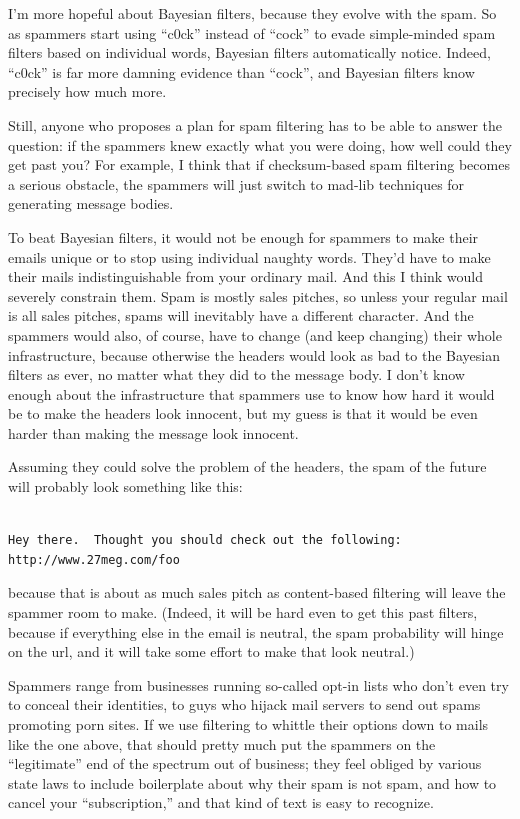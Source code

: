 I'm more hopeful about Bayesian filters, because they evolve with the
spam. So as spammers start using ``c0ck'' instead of ``cock'' to evade
simple-minded spam filters based on individual words, Bayesian filters
automatically notice. Indeed, ``c0ck'' is far more damning evidence than
``cock'', and Bayesian filters know precisely how much more.

Still, anyone who proposes a plan for spam filtering has to be able to
answer the question: if the spammers knew exactly what you were doing,
how well could they get past you? For example, I think that if
checksum-based spam filtering becomes a serious obstacle, the spammers
will just switch to mad-lib techniques for generating message bodies.

To beat Bayesian filters, it would not be enough for spammers to make
their emails unique or to stop using individual naughty words. They'd
have to make their mails indistinguishable from your ordinary mail. And
this I think would severely constrain them. Spam is mostly sales
pitches, so unless your regular mail is all sales pitches, spams will
inevitably have a different character. And the spammers would also, of
course, have to change (and keep changing) their whole infrastructure,
because otherwise the headers would look as bad to the Bayesian filters
as ever, no matter what they did to the message body. I don't know
enough about the infrastructure that spammers use to know how hard it
would be to make the headers look innocent, but my guess is that it
would be even harder than making the message look innocent.

Assuming they could solve the problem of the headers, the spam of the
future will probably look something like this:

\begin{verbatim}

Hey there.  Thought you should check out the following:
http://www.27meg.com/foo
\end{verbatim}

because that is about as much sales pitch as content-based filtering
will leave the spammer room to make. (Indeed, it will be hard even to
get this past filters, because if everything else in the email is
neutral, the spam probability will hinge on the url, and it will take
some effort to make that look neutral.)

Spammers range from businesses running so-called opt-in lists who don't
even try to conceal their identities, to guys who hijack mail servers to
send out spams promoting porn sites. If we use filtering to whittle
their options down to mails like the one above, that should pretty much
put the spammers on the ``legitimate'' end of the spectrum out of
business; they feel obliged by various state laws to include boilerplate
about why their spam is not spam, and how to cancel your
``subscription,'' and that kind of text is easy to recognize.

